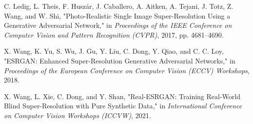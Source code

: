 \documentclass[UTF8,openany]{ctexbook}
\begin{document}
\newpage

\begin{thebibliography}{99}

   C. Ledig, L. Theis, F. Husz{\'a}r, J. Caballero, A. Aitken, A. Tejani, J. Totz, Z. Wang, and W. Shi, "Photo-Realistic Single Image Super-Resolution Using a Generative Adversarial Network," in \textit{Proceedings of the IEEE Conference on Computer Vision and Pattern Recognition (CVPR)}, 2017, pp. 4681--4690.
    
   X. Wang, K. Yu, S. Wu, J. Gu, Y. Liu, C. Dong, Y. Qiao, and C. C. Loy, "ESRGAN: Enhanced Super-Resolution Generative Adversarial Networks," in \textit{Proceedings of the European Conference on Computer Vision (ECCV) Workshops}, 2018.
    
   X. Wang, L. Xie, C. Dong, and Y. Shan, "Real-ESRGAN: Training Real-World Blind Super-Resolution with Pure Synthetic Data," in \textit{International Conference on Computer Vision Workshops (ICCVW)}, 2021.

\end{thebibliography}
\end{document}
